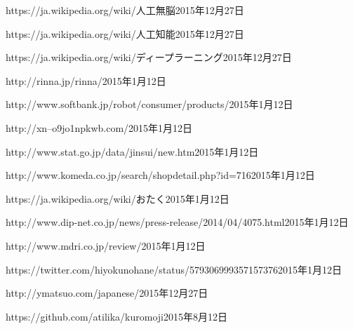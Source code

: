 \documentclass[a4paper,10pt,onecolumn,oneside,openany]{jsbook}
\begin{document}
\begin{thebibliography}{99}
	{https://ja.wikipedia.org/wiki/人工無脳}{2015年12月27日}

	{https://ja.wikipedia.org/wiki/人工知能}{2015年12月27日}

	{https://ja.wikipedia.org/wiki/ディープラーニング}{2015年12月27日}

	{http://rinna.jp/rinna/}{2015年1月12日}

	{http://www.softbank.jp/robot/consumer/products/}{2015年1月12日}

	{http://xn--o9jo1npkwb.com/}{2015年1月12日}

	{http://www.stat.go.jp/data/jinsui/new.htm}{2015年1月12日}

	{http://www.komeda.co.jp/search/shopdetail.php?id=716}{2015年1月12日}

	{https://ja.wikipedia.org/wiki/おたく}{2015年1月12日}

	{http://www.dip-net.co.jp/news/press-release/2014/04/4075.html}{2015年1月12日}

	{http://www.mdri.co.jp/review/}{2015年1月12日}

	{https://twitter.com/hiyokunohane/status/579306999357157376}{2015年1月12日}

	{http://ymatsuo.com/japanese/}{2015年12月27日}







	{https://github.com/atilika/kuromoji}{2015年8月12日}

\end{thebibliography}
\end{document}
